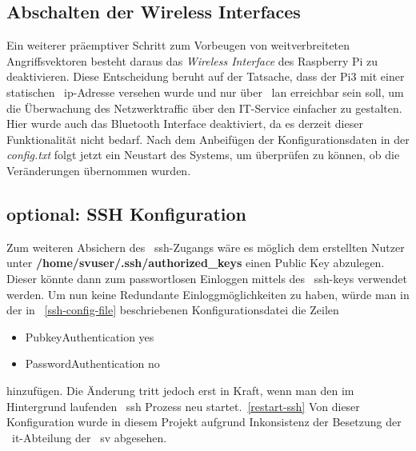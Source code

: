 \subsection{Abschalten der Wireless Interfaces}\label{subsec:abschalten-des-wireless-interface}
Ein weiterer präemptiver Schritt zum Vorbeugen von weitverbreiteten Angriffsvektoren besteht daraus das \textit{Wireless Interface} des Raspberry Pi zu deaktivieren.
Diese Entscheidung beruht auf der Tatsache, dass der Pi3 mit einer statischen ~\gls{ip}-Adresse versehen wurde und nur über ~\gls{lan} erreichbar sein soll, um die Überwachung
des Netzwerktraffic über den IT-Service einfacher zu gestalten. \\

Hier wurde auch das Bluetooth Interface deaktiviert, da es derzeit dieser Funktionalität nicht bedarf.
Nach dem Anbeifügen der Konfigurationsdaten in der \textit{config.txt} folgt jetzt ein Neustart des Systems, um überprüfen zu können, ob die Veränderungen übernommen wurden.
\subsection{optional: SSH Konfiguration}\label{subsec:ssh-konfiguration}
Zum weiteren Absichern des ~\gls{ssh}-Zugangs wäre es möglich dem erstellten Nutzer unter \textbf{/home/svuser/.ssh/authorized\_keys} einen Public Key abzulegen.
Dieser könnte dann zum passwortlosen Einloggen mittels des ~\gls{ssh}-keys verwendet werden.
Um nun keine Redundante Einloggmöglichkeiten zu haben, würde man in der in ~\ref{ssh-config-file} beschriebenen Konfigurationsdatei die Zeilen
\begin{itemize}
    \item PubkeyAuthentication yes
    \item PasswordAuthentication no
\end{itemize}
hinzufügen.
Die Änderung tritt jedoch erst in Kraft, wenn man den im Hintergrund laufenden ~\gls{ssh} Prozess neu startet.~\ref{restart-ssh}
Von dieser Konfiguration wurde in diesem Projekt aufgrund Inkonsistenz der Besetzung der ~\gls{it}-Abteilung der ~\gls{sv} abgesehen.
